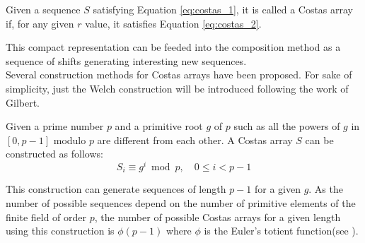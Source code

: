 \begin{definition}
  Given a sequence $S$ satisfying Equation \eqref{eq:costas_1}, it is called a
  Costas array if, for any given $r$ value, it satisfies Equation
  \eqref{eq:costas_2}.
\end{definition}

This compact representation can be feeded into the composition method as
a sequence of shifts generating interesting new
sequences\cite{moreno_costas}.\\

Several construction methods for Costas arrays have
been proposed. For sake of simplicity, just the Welch
construction will be introduced following the work of  Gilbert\cite{gilbert_costas}.

Given a prime number $p$ and a primitive root $g$ of $p$ such as all the powers of $g$ in $[0, p-1]$ modulo $p$ are different from each other.  A Costas array $S$
can be constructed as follows:
\begin{equation}
  S_{i} \equiv g^{i} \bmod p, \quad 0 \leq i <p-1
\end{equation}

This  construction can generate sequences of  length $p-1$ for a given $g$. As the number of possible sequences depend on the number of primitive
elements of the finite field of order $p$, the number of possible Costas arrays
for a given length using this construction is $\phi(p-1)$ where $\phi$ is the
Euler's totient function(see
\citet{manfred_totient}).
